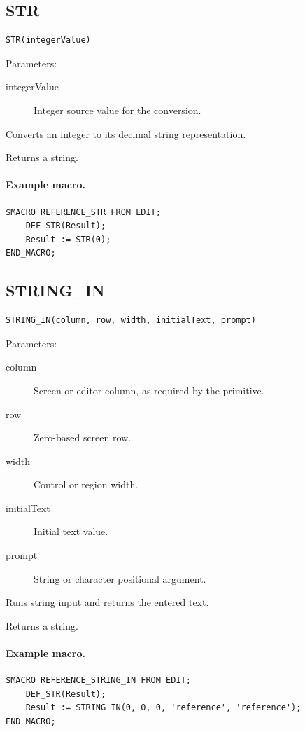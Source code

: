 \documentclass[a4paper,10pt,twoside,openany]{book}
\begin{document}
\label{prim:intrinsic-str}
\subsection*{STR}
\begin{verbatim}
STR(integerValue)
\end{verbatim}
Parameters:
\begin{description}
\item[integerValue] Integer source value for the conversion.
\end{description}

Converts an integer to its decimal string representation.

Returns a string.

\paragraph{Example macro.}
\begin{verbatim}
$MACRO REFERENCE_STR FROM EDIT;
    DEF_STR(Result);
    Result := STR(0);
END_MACRO;
\end{verbatim}

\label{prim:intrinsic-string-in}
\subsection*{STRING\_IN}
\begin{verbatim}
STRING_IN(column, row, width, initialText, prompt)
\end{verbatim}
Parameters:
\begin{description}
\item[column] Screen or editor column, as required by the primitive.
\item[row] Zero-based screen row.
\item[width] Control or region width.
\item[initialText] Initial text value.
\item[prompt] String or character positional argument.
\end{description}

Runs string input and returns the entered text.

Returns a string.

\paragraph{Example macro.}
\begin{verbatim}
$MACRO REFERENCE_STRING_IN FROM EDIT;
    DEF_STR(Result);
    Result := STRING_IN(0, 0, 0, 'reference', 'reference');
END_MACRO;
\end{verbatim}
\end{document}
